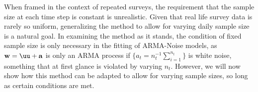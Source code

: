 



When framed in the context of repeated surveys, the requirement that the sample size at each time step is constant is unrealistic. Given that real life survey data is rarely so uniform, generalizing the method to allow for varying daily sample size is a natural goal. In examining the method as it stands, the condition of fixed sample size is only necessary in the fitting of ARMA-Noise models, as $\mathbf{w} = \uu + \mathbf{a}$ is only an ARMA process if $\{a_t=n_t^{-1}\sum_{i=1}^{n_t}\}$ is white noise, something that at first glance is violated by varying $n_t$. However, we will now show how this method can be adapted to allow for varying sample sizes, so long as certain conditions are met.



